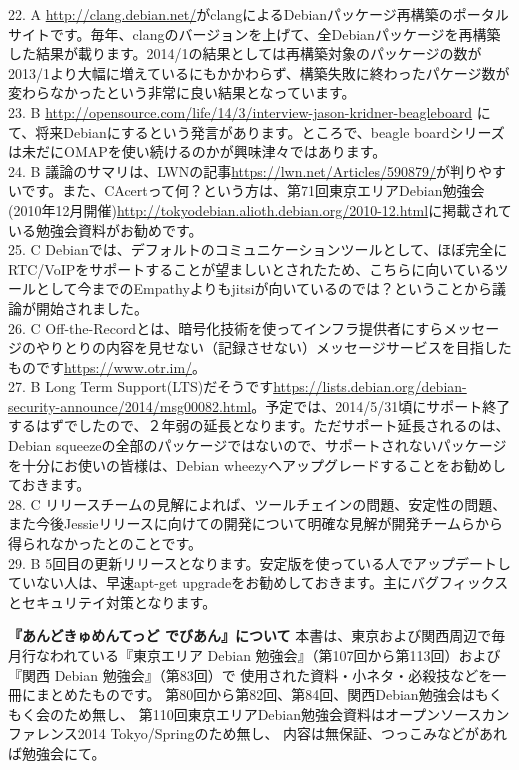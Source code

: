 \documentclass[mingoth,a4paper]{jsarticle}
\begin{document}
{22. A \url {http://clang.debian.net/}がclangによるDebianパッケージ再構築のポータルサイトです。毎年、clangのバージョンを上げて、全Debianパッケージを再構築した結果が載ります。2014/1の結果としては再構築対象のパッケージの数が2013/1より大幅に増えているにもかかわらず、構築失敗に終わったパケージ数が変わらなかったという非常に良い結果となっています。\\
23. B \url {http://opensource.com/life/14/3/interview-jason-kridner-beagleboard} にて、将来Debianにするという発言があります。ところで、beagle boardシリーズは未だにOMAPを使い続けるのかが興味津々ではあります。\\
24. B 議論のサマリは、LWNの記事\url {https://lwn.net/Articles/590879/}が判りやすいです。また、CAcertって何？という方は、第71回東京エリアDebian勉強会(2010年12月開催)\url {http://tokyodebian.alioth.debian.org/2010-12.html}に掲載されている勉強会資料がお勧めです。\\
25. C Debianでは、デフォルトのコミュニケーションツールとして、ほぼ完全にRTC/VoIPをサポートすることが望ましいとされたため、こちらに向いているツールとして今までのEmpathyよりもjitsiが向いているのでは？ということから議論が開始されました。\\
26. C Off-the-Recordとは、暗号化技術を使ってインフラ提供者にすらメッセージのやりとりの内容を見せない（記録させない）メッセージサービスを目指したものです\url {https://www.otr.im/}。\\
27. B Long Term Support(LTS)だそうです\url {https://lists.debian.org/debian-security-announce/2014/msg00082.html}。予定では、2014/5/31頃にサポート終了するはずでしたので、２年弱の延長となります。ただサポート延長されるのは、Debian squeezeの全部のパッケージではないので、サポートされないパッケージを十分にお使いの皆様は、Debian wheezyへアップグレードすることをお勧めしておきます。\\
28. C リリースチームの見解によれば、ツールチェインの問題、安定性の問題、また今後Jessieリリースに向けての開発について明確な見解が開発チームらから得られなかったとのことです。 \\
29. B 5回目の更新リリースとなります。安定版を使っている人でアップデートしていない人は、早速apt-get upgradeをお勧めしておきます。主にバグフィックスとセキュリテイ対策となります。\\
}

\pagestyle{empty}
\cleartoevenpage

\newpage
{
\large
\begin{itembox}{\bf 『あんどきゅめんてっど でびあん』について}
本書は、東京および関西周辺で毎月行なわれている『東京エリア Debian 勉強会』（第107回から第113回）および
『関西 Debian 勉強会』（第83回）で
使用された資料・小ネタ・必殺技などを一冊にまとめたものです。
第80回から第82回、第84回、関西Debian勉強会はもくもく会のため無し、
第110回東京エリアDebian勉強会資料はオープンソースカンファレンス2014 Tokyo/Springのため無し、
内容は無保証、つっこみなどがあれば勉強会にて。
\end{itembox}
}
\end{document}
